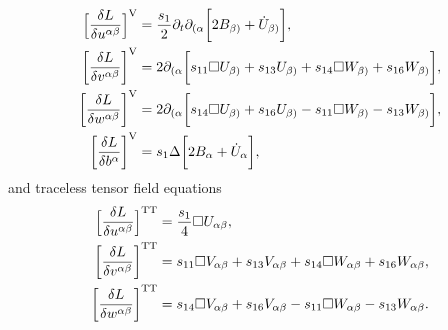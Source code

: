 \begin{align}\footnotesize
  \bigg\lbrack\frac{\delta L}{\delta u^{\alpha\beta}}\bigg\rbrack^\text{V} = {} & \frac{s_1}{2} \partial_t \partial_{(\alpha} \bigg\lbrack 2 B_{\beta)} + \dot U_{\beta)}\bigg\rbrack, \nonumber \\
  \bigg\lbrack\frac{\delta L}{\delta v^{\alpha\beta}}\bigg\rbrack^\text{V} = {} & 2 \partial_{(\alpha} \bigg\lbrack  s_{11} \Box U_{\beta)} + s_{13} U_{\beta)} +  s_{14} \Box W_{\beta)} +  s_{16} W_{\beta)} \bigg\rbrack, \nonumber \\
  \bigg\lbrack\frac{\delta L}{\delta w^{\alpha\beta}}\bigg\rbrack^\text{V} = {} & 2 \partial_{(\alpha} \bigg\lbrack s_{14} \Box U_{\beta)} + s_{16} U_{\beta)} - s_{11} \Box W_{\beta)} - s_{13} W_{\beta)} \bigg\rbrack, \label{vector_equations_reduced} \\
  \bigg\lbrack\frac{\delta L}{\delta b^\alpha}\bigg\rbrack^\text{V} = {} & s_1 \Delta\bigg\lbrack 2 B_{\alpha} + \dot U_{\alpha} \bigg\rbrack, \nonumber
\end{align}
\endgroup
and traceless tensor field equations
\begingroup\allowdisplaybreaks
\begin{align}\footnotesize
  \bigg\lbrack\frac{\delta L}{\delta u^{\alpha\beta}}\bigg\rbrack^\text{TT} = {} & \frac{s_1}{4} \Box U_{\alpha\beta}, \nonumber \\
  \bigg\lbrack\frac{\delta L}{\delta v^{\alpha\beta}}\bigg\rbrack^\text{TT} = {} & s_{11} \Box V_{\alpha\beta} + s_{13} V_{\alpha\beta} + s_{14} \Box W_{\alpha\beta} + s_{16} W_{\alpha\beta}, \label{tensor_equations_reduced} \\
  \bigg\lbrack\frac{\delta L}{\delta w^{\alpha\beta}}\bigg\rbrack^\text{TT} = {} & s_{14} \Box V_{\alpha\beta} + s_{16} V_{\alpha\beta} - s_{11} \Box W_{\alpha\beta} - s_{13} W_{\alpha\beta}. \nonumber
\end{align}
\endgroup

